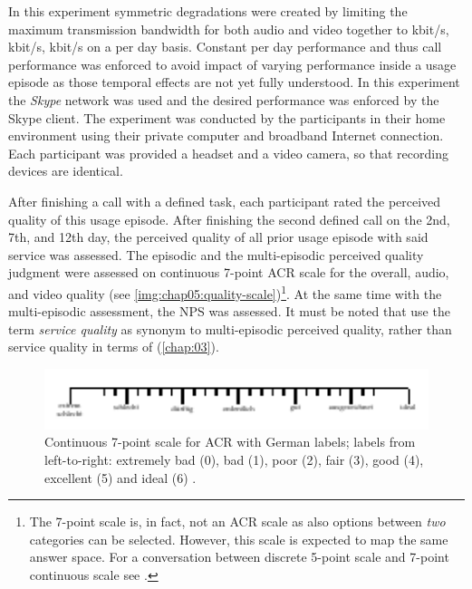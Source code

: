 In this experiment symmetric degradations were created by limiting the maximum transmission bandwidth for both audio and video together to \unit[500]{kbit/s}, \unit[150]{kbit/s}, \unit[32]{kbit/s} on a per day basis.
Constant per day performance and thus call performance was enforced to avoid impact of varying performance inside a usage episode as those temporal effects are not yet fully understood.
In this experiment the \emph{Skype} network was used and the desired performance was enforced by the Skype client.
The experiment was conducted by the participants in their home environment using their private computer and broadband Internet connection.
Each participant was provided a headset and a video camera, so that recording devices are identical.

After finishing a call with a defined task, each participant rated the perceived quality of this usage episode.
After finishing the second defined call on the 2nd, 7th, and 12th day, the perceived quality of all prior usage episode with said service was assessed.
The episodic and the multi-episodic perceived quality judgment were assessed on continuous 7-point \ac{ACR} scale \citep[\cf][p. 19]{itu-t_p.851:_2003} for the overall, audio, and video quality (see \autoref{img:chap05:quality-scale})\footnote{The 7-point scale is, in fact, not an \ac{ACR} scale as also options between \emph{two} categories can be selected. However, this scale is expected to map the same answer space. For a conversation between discrete 5-point scale and 7-point continuous scale see \cite{koster_comparison_2015}.}.
At the same time with the multi-episodic assessment, the \ac{NPS} was assessed.
It must be noted that \cite{moller_single-call_2011} use the term \emph{service quality} as synonym to multi-episodic perceived quality, rather than service quality in terms of \cite{parasuraman_conceptual_1985} (\cf \autoref{chap:03}).

\begin{figure}[h]
	\includegraphics[width=1\textwidth]{figure/quality7pt_scale}
	\caption{Continuous 7-point scale for \ac{ACR} with German labels; labels from left-to-right: extremely bad (0), bad (1), poor (2), fair (3), good (4), excellent (5) and ideal (6) \citep{itu-t_p.805:_2007}.}
	\label{img:chap05:quality-scale}
\end{figure}

